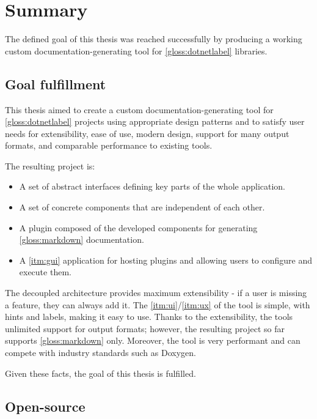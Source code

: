 \chapter*{Summary}

The defined goal of this thesis was reached successfully by producing a working custom documentation-generating tool for \ref{gloss:dotnetlabel} libraries.

\section*{Goal fulfillment}

This thesis aimed to create a custom documentation-generating tool for \ref{gloss:dotnetlabel} projects using appropriate design patterns \cite{humblot_design_2021} and to satisfy user needs for extensibility, ease of use, modern design, support for many output formats, and comparable performance to existing tools.

The resulting project is:
\begin{itemize}
    \item A set of abstract interfaces defining key parts of the whole application.
    \item A set of concrete components that are independent of each other.
    \item A plugin composed of the developed components for generating \ref{gloss:markdown} documentation.
    \item A \ref{itm:gui} application for hosting plugins and allowing users to configure and execute them.
\end{itemize}

The decoupled architecture provides maximum extensibility - if a user is missing a feature, they can always add it. The \ref{itm:ui}/\ref{itm:ux} of the tool is simple, with hints and labels, making it easy to use. Thanks to the extensibility, the tools unlimited support for output formats; however, the resulting project so far supports \ref{gloss:markdown} only. Moreover, the tool is very performant and can compete with industry standards such as Doxygen.

Given these facts, the goal of this thesis is fulfilled.

\section*{Open-source} \label{sec:openSource}

